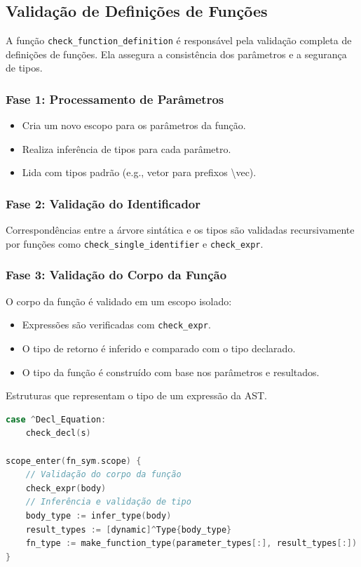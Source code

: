 \subsection*{Validação de Definições de Funções}

A função \texttt{check\_function\_definition} é responsável pela validação completa de definições de funções. Ela assegura a consistência dos parâmetros e a segurança de tipos.

\subsubsection*{Fase 1: Processamento de Parâmetros}
\begin{itemize}
  \item Cria um novo escopo para os parâmetros da função.
  \item Realiza inferência de tipos para cada parâmetro.
  \item Lida com tipos padrão (e.g., vetor para prefixos \textbackslash{}vec).
\end{itemize}

\subsubsection*{Fase 2: Validação do Identificador}
Correspondências entre a árvore sintática e os tipos são validadas recursivamente por funções como \texttt{check\_single\_identifier} e \texttt{check\_expr}.

\subsubsection*{Fase 3: Validação do Corpo da Função}
O corpo da função é validado em um escopo isolado:
\begin{itemize}
  \item Expressões são verificadas com \texttt{check\_expr}.
  \item O tipo de retorno é inferido e comparado com o tipo declarado.
  \item O tipo da função é construído com base nos parâmetros e resultados.
\end{itemize}

\begin{codigo}[htb]
    \caption{\small Estruturas que representam o tipo de um expressão da AST.}
    \label{cod-types-structs}
\begin{lstlisting}[language=C, numbers=none, frame=none, inputencoding=utf8]
case ^Decl_Equation:
    check_decl(s)

scope_enter(fn_sym.scope) {
    // Validação do corpo da função
    check_expr(body)
    // Inferência e validação de tipo
    body_type := infer_type(body)
    result_types := [dynamic]^Type{body_type}
    fn_type := make_function_type(parameter_types[:], result_types[:])
}
\end{lstlisting}
\end{codigo}

